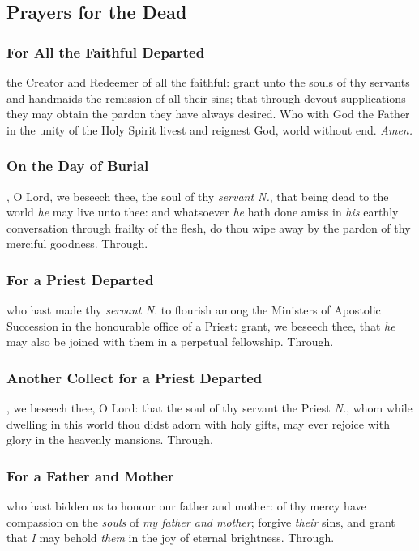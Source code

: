 \clearpage
\subsection{Prayers for the Dead}\label{dead}
\subsubsection{For All the Faithful Departed}
 the Creator and Redeemer of all the faithful: grant unto the souls of thy servants and handmaids the remission of all their sins; that through devout supplications they may obtain the pardon they have always desired. Who with God the Father in the unity of the Holy Spirit livest and reignest God, world without end. \textit{Amen.}

\subsubsection{On the Day of Burial}

, O Lord, we beseech thee, the soul of thy \textit{servant N.}, that being dead to the world \textit{he} may live unto thee: and whatsoever \textit{he} hath done amiss in \textit{his} earthly conversation through frailty of the flesh, do thou wipe away by the pardon of thy merciful goodness. Through.

\subsubsection{For a Priest Departed}

 who hast made thy \textit{servant N.} to flourish among the Ministers of Apostolic Succession in the honourable office of a Priest: grant, we beseech thee, that \textit{he} may also be joined with them in a perpetual fellowship. Through.

\subsubsection{Another Collect for a Priest Departed}

, we beseech thee, O Lord: that the soul of thy servant the Priest \textit{N.}, whom while dwelling in this world thou didst adorn with holy gifts, may ever rejoice with glory in the heavenly mansions. Through.

\subsubsection{For a Father and Mother}
 who hast bidden us to honour our father and mother: of thy mercy have compassion on the \textit{souls} of \textit{my father and mother}; forgive \textit{their} sins, and grant that \textit{I} may behold \textit{them} in the joy of eternal brightness. Through.

